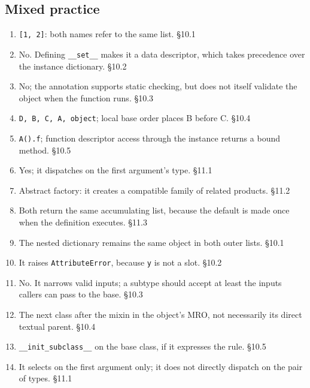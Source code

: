 \documentclass[11pt]{article}
\begin{document}
\begin{keepsection}\subsection{Mixed practice}

\begin{enumerate}
\item \texttt{[1, 2]}: both names refer to the same list. \hfill{\small\color{FAUblue}§10.1}
\item No. Defining \texttt{\_\_set\_\_} makes it a data descriptor, which takes precedence over the instance dictionary. \hfill{\small\color{FAUblue}§10.2}
\item No; the annotation supports static checking, but does not itself validate the object when the function runs. \hfill{\small\color{FAUblue}§10.3}
\item \texttt{D, B, C, A, object}; local base order places B before C. \hfill{\small\color{FAUblue}§10.4}
\item \texttt{A().f}; function descriptor access through the instance returns a bound method. \hfill{\small\color{FAUblue}§10.5}
\item Yes; it dispatches on the first argument’s type. \hfill{\small\color{FAUblue}§11.1}
\item Abstract factory: it creates a compatible family of related products. \hfill{\small\color{FAUblue}§11.2}
\item Both return the same accumulating list, because the default is made once when the definition executes. \hfill{\small\color{FAUblue}§11.3}
\item The nested dictionary remains the same object in both outer lists. \hfill{\small\color{FAUblue}§10.1}
\item It raises \texttt{AttributeError}, because \texttt{y} is not a slot. \hfill{\small\color{FAUblue}§10.2}
\item No. It narrows valid inputs; a subtype should accept at least the inputs callers can pass to the base. \hfill{\small\color{FAUblue}§10.3}
\item The next class after the mixin in the object’s MRO, not necessarily its direct textual parent. \hfill{\small\color{FAUblue}§10.4}
\item \texttt{\_\_init\_subclass\_\_} on the base class, if it expresses the rule. \hfill{\small\color{FAUblue}§10.5}
\item It selects on the first argument only; it does not directly dispatch on the pair of types. \hfill{\small\color{FAUblue}§11.1}

\end{enumerate}
\end{keepsection}
\end{document}
